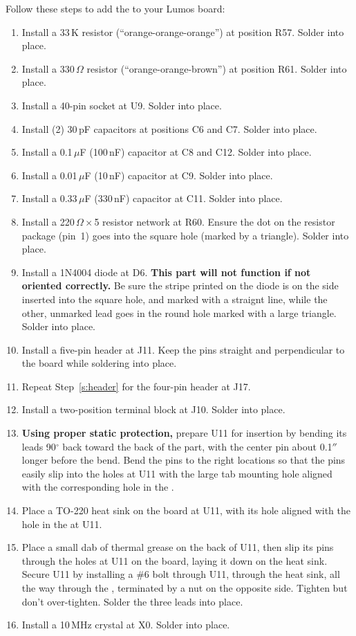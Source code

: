 \documentclass[letterpaper,twoside,onecolumn,openright,final]{memoir}
\begin{document}
Follow these steps to add the  to your Lumos board:
\begin{enumerate}
\item	Install a 33\,K resistor (``orange-orange-orange'') at position R57.  Solder into place.
\item	Install a 330\,$\Omega$ resistor (``orange-orange-brown'') at position R61.  Solder into place.
\item	Install a 40-pin  socket at U9. Solder into place.

\item	Install (2) 30\,pF capacitors at positions C6 and C7. Solder into place.
\item	Install a 0.1\,$\mu$F (100\,nF) capacitor at C8 and C12.  Solder into place.
\item	Install a 0.01\,$\mu$F (10\,nF) capacitor at C9. Solder into place.
\item	Install a 0.33\,$\mu$F (330\,nF) capacitor at C11.  Solder into place.
\item	Install a 220\,$\Omega\times$5 resistor network at R60.  Ensure the dot on the resistor package
	(pin~1) goes into the square hole (marked by a triangle).  Solder into place.
\item	Install a 1N4004 diode at D6.  {\bfseries This part will not function if not oriented
	correctly.} Be sure the stripe printed on the diode is on the side inserted into the
	square hole, and marked with a straignt line, while the other, unmarked lead goes in the
	round hole marked with a large triangle.  Solder into place.
\item\label{s:header}
	Install a five-pin header at J11.  Keep the pins straight and perpendicular to the board
	while soldering into place.
\item	Repeat Step~\ref{s:header} for the four-pin header at J17.
\item	Install a two-position terminal block at J10.  Solder into place.
\item	{\bfseries Using proper static protection,} prepare U11 for insertion by bending its
	leads 90$^\circ$ back toward the back of the part, with the center pin about 0.1$''$ longer
	before the bend.  Bend the pins to the right locations so that the pins easily
	slip into the holes at U11 with the large tab mounting hole aligned with the corresponding hole in
	the .
\item	Place a TO-220 heat sink on the board at U11, with its hole aligned with the hole in the
	 at U11.
\item	Place a small dab of thermal grease on the back of U11, then slip its pins through the holes
	at U11 on the board, laying it down on the heat sink.  Secure U11 by installing a \#6
	bolt through U11, through the heat sink, all the way through the , terminated
	by a nut on the opposite side.  Tighten but don't over-tighten.  Solder the three leads
	into place.
\item	Install a 10\,MHz crystal at X0.  Solder into place.



\end{enumerate}
\end{document}
